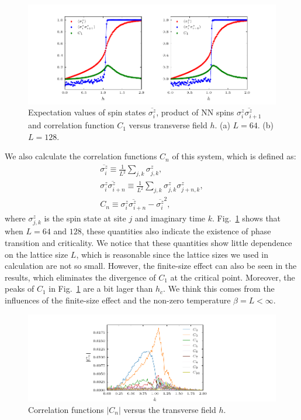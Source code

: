 \documentclass{article}
\theoremstyle{plain} \newtheorem{thm}{Theorem}[section]
\theoremstyle{definition} \newtheorem{df}{Definition}[section]
\theoremstyle{definition} \newtheorem{eg}{Example}
\theoremstyle{remark} \newtheorem*{rmk}{Remark}
\begin{document}
\begin{figure}[htpb]
  \centering
  \includegraphics[width=\textwidth]{figs/correlation_functions.pdf}
  \caption{Expectation values of spin states $\overline{\sigma_i^z}$, product of NN spins $\overline{\sigma_i^z \sigma_{i+1}^z}$ and correlation function $C_1$ versus transverse field $h$. (a) $L = 64$. (b) $L = 128$.}
  \label{fig:correlation_functions}
\end{figure}

We also calculate the correlation functions $C_n$ of this system, which is defined as:
\begin{gather}
  \overline{\sigma_i^z} \equiv \frac{1}{L^2}\sum_{j,k}\sigma_{j,k}^z,\\
  \overline{\sigma_i^z \sigma_{i+n}^z} \equiv \frac{1}{L^2} \sum_{j,k}\sigma_{j,k}^z \sigma_{j+n,k}^z,\\
  C_n \equiv \overline{\sigma_i^z \sigma_{i+n}^z}-\overline{\sigma_i^z}^2,
\end{gather}
where $\sigma_{j,k}^z$ is the spin state at site $j$ and imaginary time $k$. Fig.~\ref{fig:correlation_functions} shows that when $L = 64$ and $128$, these quantities also indicate the existence of phase transition and criticality. We notice that these quantities show little dependence on the lattice size $L$, which is reasonable since the lattice sizes we used in calculation are not so small. However, the finite-size effect can also be seen in the results, which eliminates the divergence of $C_1$ at the critical point. Moreover, the peaks of $C_1$ in Fig.~\ref{fig:correlation_functions} are a bit lager than $h_c$. We think this comes from the influences of the finite-size effect and the non-zero temperature $\beta = L < \infty$.

\begin{figure}[htpb]
  \centering
  \includegraphics[width=\textwidth]{figs/C_n.pdf}
  \caption{Correlation functions $|C_n|$ versus the transverse field $h$.}
  \label{fig:C_n}
\end{figure}
\end{document}
